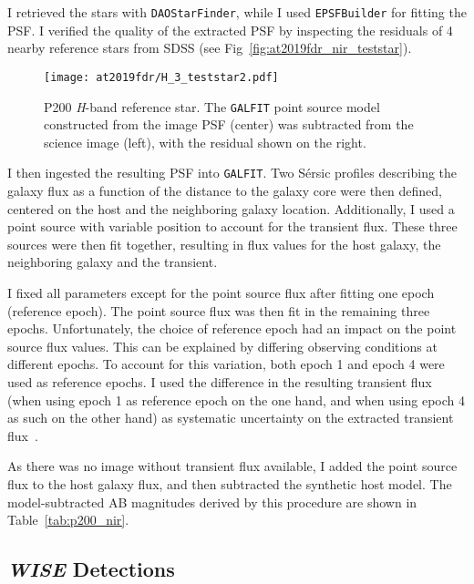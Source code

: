 I retrieved the stars with \texttt{DAOStarFinder}, while I used \texttt{EPSFBuilder} for fitting the PSF. I verified the quality of the extracted PSF by inspecting the residuals of 4 nearby reference stars from SDSS (see Fig~\ref{fig:at2019fdr_nir_teststar}).

\begin{figure}[htb]
    \texttt{[image: at2019fdr/H\_3\_teststar2.pdf]}
    \caption[P200 \textit{H}-band reference star]{P200 \textit{H}-band reference star. The \texttt{GALFIT} point source model constructed from the image PSF (center) was subtracted from the science image (left), with the residual shown on the right.}
\end{figure}

I then ingested the resulting PSF into \texttt{GALFIT}. Two Sérsic  profiles describing the galaxy flux as a function of the distance to the galaxy core were then defined, centered on the host and the neighboring galaxy location. Additionally, I used a point source with variable position to account for the transient flux. These three sources were then fit together, resulting in flux values for the host galaxy, the neighboring galaxy and the transient.

I fixed all parameters except for the point source flux after fitting one epoch (reference epoch). The point source flux was then fit in the remaining three epochs. Unfortunately, the choice of reference epoch had an impact on the point source flux values. This can be explained by differing observing conditions at different epochs. To account for this variation, both epoch 1 and epoch 4 were used as reference epochs. I used the difference in the resulting transient flux (when using epoch 1 as reference epoch on the one hand, and when using epoch 4 as such on the other hand) as systematic uncertainty on the extracted transient flux~\cite{Reusch2022}.

As there was no image without transient flux available, I added the point source flux to the host galaxy flux, and then subtracted the synthetic host model. The model-subtracted AB magnitudes derived by this procedure are shown in Table~\ref{tab:p200_nir}.

\subsection{\textit{WISE} Detections}

